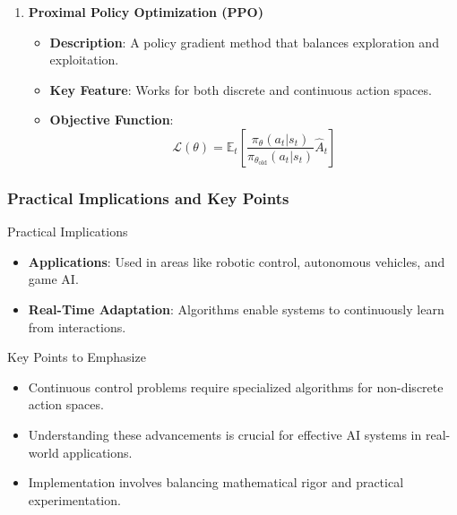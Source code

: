 \documentclass[aspectratio=169]{beamer}
\begin{document}
\begin{frame}[fragile]
\begin{enumerate}
        \item \textbf{Proximal Policy Optimization (PPO)}
            \begin{itemize}
                \item \textbf{Description}: A policy gradient method that balances exploration and exploitation.
                \item \textbf{Key Feature}: Works for both discrete and continuous action spaces.
                \item \textbf{Objective Function}:
                \begin{equation}
                    \mathcal{L}(\theta) = \mathbb{E}_t \left[\frac{\pi_\theta(a_t|s_t)}{\pi_{\theta_{\text{old}}}(a_t|s_t)} \hat{A}_t\right]
                \end{equation}
            \end{itemize}
    \end{enumerate}
\end{frame}

\begin{frame}[fragile]
    \frametitle{Practical Implications and Key Points}
    \begin{block}{Practical Implications}
        \begin{itemize}
            \item \textbf{Applications}: Used in areas like robotic control, autonomous vehicles, and game AI.
            \item \textbf{Real-Time Adaptation}: Algorithms enable systems to continuously learn from interactions.
        \end{itemize}
    \end{block}

    \begin{block}{Key Points to Emphasize}
        \begin{itemize}
            \item Continuous control problems require specialized algorithms for non-discrete action spaces.
            \item Understanding these advancements is crucial for effective AI systems in real-world applications.
            \item Implementation involves balancing mathematical rigor and practical experimentation.
        \end{itemize}
    \end{block}
\end{frame}
\end{document}
